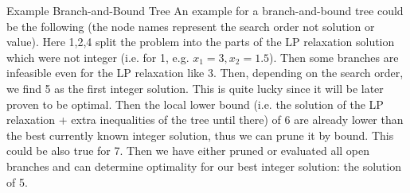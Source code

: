 \documentclass[english]{panikzettel}
\begin{document}
\begin{bonus}{Example Branch-and-Bound Tree}
	An example for a branch-and-bound tree could be the following (the node names represent the search order not solution or value).
	Here 1,2,4 split the problem into the parts of the LP relaxation solution which were not integer (i.e. for 1, e.g. $x_1 = 3, x_2 = 1.5$).
	Then some branches are infeasible even for the LP relaxation like 3. Then, depending on the search order, we find 5 as the first integer solution. This is quite lucky since it will be later proven to be optimal.
	Then the local lower bound (i.e. the solution of the LP relaxation + extra inequalities of the tree until there) of 6 are already lower than the best currently known integer solution,  thus we can prune it by bound.
	This could be also true for 7.
	Then we have either pruned or evaluated all open branches and can determine optimality for our best integer solution: the solution of 5.

	\vspace{\baselineskip}

	\begin{center}
	\end{center}
\end{bonus}
\end{document}
